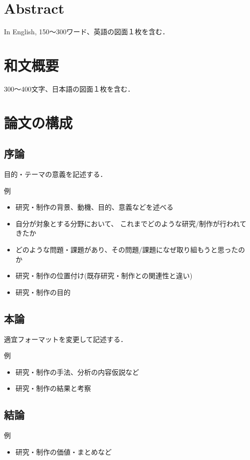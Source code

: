 \section*{Abstract}
In English, 150〜300ワード、英語の図面１枚を含む．
\clearpage

\section*{和文概要}
300〜400文字、日本語の図面１枚を含む．
\clearpage

\section{論文の構成}
\subsection{序論}
目的・テーマの意義を記述する．

例
\begin{itemize}
  \item{研究・制作の背景、動機、目的、意義などを述べる}
  \item{自分が対象とする分野において、 これまでどのような研究/制作が行われてきたか}
  \item{どのような問題・課題があり、その問題/課題になぜ取り組もうと思ったのか}
  \item{研究・制作の位置付け(既存研究・制作との関連性と違い)}
  \item{研究・制作の目的}
\end{itemize}

\subsection{本論}
適宜フォーマットを変更して記述する．

例
\begin{itemize}
  \item{研究・制作の手法、分析の内容仮説など}
  \item{研究・制作の結果と考察}
\end{itemize}

\subsection{結論}
例
\begin{itemize}
  \item{研究・制作の価値・まとめなど}
\end{itemize}

